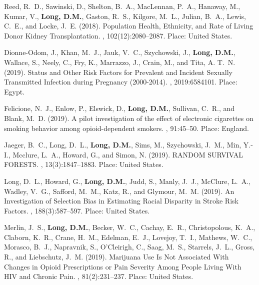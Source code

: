 \begin{thebibliography}{}
Reed, R.~D., Sawinski, D., Shelton, B.~A., MacLennan, P.~A., Hanaway, M.,
  Kumar, V., \textbf{Long, D.M.}, Gaston, R.~S., Kilgore, M.~L., Julian, B.~A., Lewis,
  C.~E., and Locke, J.~E. (2018).
\newblock Population {Health}, {Ethnicity}, and {Rate} of {Living} {Donor}
  {Kidney} {Transplantation}.
, 102(12):2080--2087.
\newblock Place: United States.

Dionne-Odom, J., Khan, M.~J., Jauk, V.~C., Szychowski, J., \textbf{Long, D.M.},
  Wallace, S., Neely, C., Fry, K., Marrazzo, J., Crain, M., and Tita, A. T.~N.
  (2019).
 {Status} and {Other} {Risk} {Factors} for {Prevalent} and
  {Incident} {Sexually} {Transmitted} {Infection} during {Pregnancy}
  (2000-2014).
, 2019:6584101.
\newblock Place: Egypt.

Felicione, N.~J., Enlow, P., Elswick, D., \textbf{Long, D.M.}, Sullivan, C.~R., and Blank,
  M.~D. (2019).
\newblock A pilot investigation of the effect of electronic cigarettes on
  smoking behavior among opioid-dependent smokers.
, 91:45--50.
\newblock Place: England.

Jaeger, B.~C., Long, D.~L., \textbf{Long, D.M.}, Sims, M., Szychowski, J.~M., Min,
  Y.-I., Mcclure, L.~A., Howard, G., and Simon, N. (2019).
 {RANDOM} {SURVIVAL} {FORESTS}.
, 13(3):1847--1883.
\newblock Place: United States.

Long, D.~L., Howard, G., \textbf{Long, D.M.}, Judd, S., Manly, J.~J., McClure, L.~A.,
  Wadley, V.~G., Safford, M.~M., Katz, R., and Glymour, M.~M. (2019).
\newblock An {Investigation} of {Selection} {Bias} in {Estimating} {Racial}
  {Disparity} in {Stroke} {Risk} {Factors}.
, 188(3):587--597.
\newblock Place: United States.

Merlin, J.~S., \textbf{Long, D.M.}, Becker, W.~C., Cachay, E.~R., Christopolous, K.~A.,
  Claborn, K.~R., Crane, H.~M., Edelman, E.~J., Lovejoy, T.~I., Mathews, W.~C.,
  Morasco, B.~J., Napravnik, S., O'Cleirigh, C., Saag, M.~S., Starrels, J.~L.,
  Gross, R., and Liebschutz, J.~M. (2019).
\newblock Marijuana {Use} {Is} {Not} {Associated} {With} {Changes} in {Opioid}
  {Prescriptions} or {Pain} {Severity} {Among} {People} {Living} {With} {HIV}
  and {Chronic} {Pain}.
,
  81(2):231--237.
\newblock Place: United States.


\end{thebibliography}
